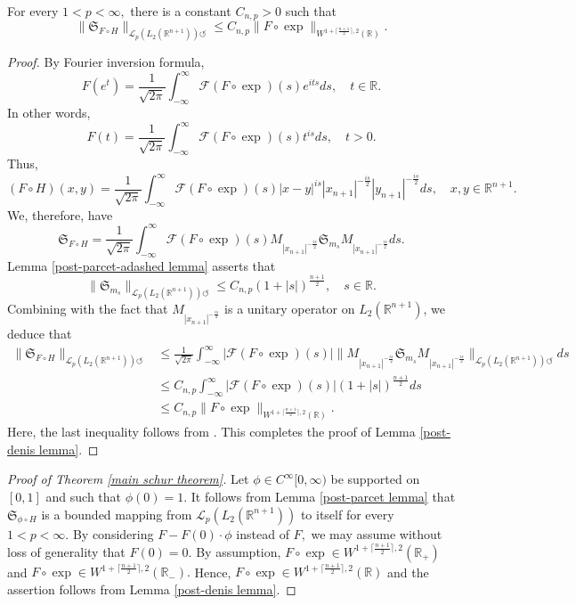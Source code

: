 \documentclass[12pt]{amsart}
\begin{document}
\begin{lemma}\label{post-denis lemma} For every $1<p<\infty,$ there is a constant $C_{n,p}>0$ such that
$$\|\mathfrak{S}_{F\circ H}\|_{\mathcal{L}_p(L_2(\mathbb{R}^{n+1}))\circlearrowleft}\leq C_{n,p}\|F\circ\exp\|_{W^{1+\lceil\frac{n+1}{2}\rceil,2}(\mathbb{R})}.$$
\end{lemma}
\begin{proof} By Fourier inversion formula,
$$F(e^t)=\frac1{\sqrt{2\pi}}\int_{-\infty}^{\infty}\mathcal{F}(F\circ\exp)(s)e^{its}ds,\quad t\in\mathbb{R}.$$
In other words,
$$F(t)=\frac1{\sqrt{2\pi}}\int_{-\infty}^{\infty}\mathcal{F}(F\circ\exp)(s)t^{is}ds,\quad t>0.$$
Thus,
$$(F\circ H)(x,y)=\frac1{\sqrt{2\pi}}\int_{-\infty}^{\infty}\mathcal{F}(F\circ\exp)(s)|x-y|^{is}|x_{n+1}|^{-\frac{is}{2}}|y_{n+1}|^{-\frac{is}{2}}ds,\quad x,y\in\mathbb{R}^{n+1}.$$
We, therefore, have
$$\mathfrak{S}_{F\circ H}=\frac1{\sqrt{2\pi}}\int_{-\infty}^{\infty}\mathcal{F}(F\circ\exp)(s)M_{|x_{n+1}|^{-\frac{is}{2}}}\mathfrak{S}_{m_s}M_{|x_{n+1}|^{-\frac{is}{2}}}ds.$$
Lemma \ref{post-parcet-adashed lemma} asserts that
$$\|\mathfrak{S}_{m_s}\|_{\mathcal{L}_p(L_2(\mathbb{R}^{n+1}))\circlearrowleft}\leq C_{n,p}(1+|s|)^{\frac{n+1}{2}},\quad s\in\mathbb{R}.$$
Combining with the fact that $M_{|x_{n+1}|^{-\frac{is}{2}}}$ is a unitary operator on $L_2(\mathbb{R}^{n+1})$, we deduce that
\begin{align*}
\|\mathfrak{S}_{F\circ H}\|_{\mathcal{L}_p(L_2(\mathbb{R}^{n+1}))\circlearrowleft}
&\leq\frac1{\sqrt{2\pi}}\int_{-\infty}^{\infty}|\mathcal{F}(F\circ\exp)(s)|\big\|M_{|x_{n+1}|^{-\frac{is}{2}}}\mathfrak{S}_{m_s}M_{|x_{n+1}|^{-\frac{is}{2}}}\big\|_{\mathcal{L}_p(L_2(\mathbb{R}^{n+1}))\circlearrowleft}ds\\
&\leq C_{n,p}\int_{-\infty}^{\infty}|\mathcal{F}(F\circ\exp)(s)| (1+|s|)^{\frac{n+1}{2}}ds\\
&\leq C_{n,p}\|F\circ\exp\|_{W^{1+\lceil\frac{n+1}{2}\rceil,2}(\mathbb{R})}.
\end{align*}
Here, the last inequality follows from \cite[Lemma 7]{PS-crelle}. This completes the proof of Lemma \ref{post-denis lemma}.
\end{proof}

\begin{proof}[Proof of Theorem \ref{main schur theorem}] Let $\phi\in C^{\infty}[0,\infty)$ be supported on $[0,1]$ and such that $\phi(0)=1.$ It follows from Lemma \ref{post-parcet lemma} that $\mathfrak{S}_{\phi\circ H}$ is a bounded mapping from $\mathcal{L}_p(L_2(\mathbb{R}^{n+1}))$ to itself for every $1<p<\infty.$ By considering $F-F(0)\cdot\phi$ instead of $F,$ we may assume without loss of generality that $F(0)=0.$ By assumption, $F\circ\exp\in W^{1+\lceil\frac{n+1}{2}\rceil,2}(\mathbb{R}_+)$ and $F\circ\exp\in W^{1+\lceil\frac{n+1}{2}\rceil,2}(\mathbb{R}_-).$ Hence, $F\circ\exp\in W^{1+\lceil\frac{n+1}{2}\rceil,2}(\mathbb{R})$ and the assertion follows from Lemma \ref{post-denis lemma}.
\end{proof}
\end{document}
